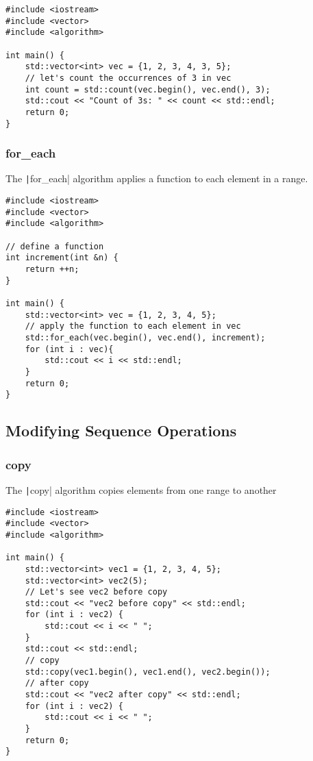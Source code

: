 \documentclass{article}
\begin{document}
\begin{verbatim}
#include <iostream>
#include <vector>
#include <algorithm>

int main() {
    std::vector<int> vec = {1, 2, 3, 4, 3, 5};
    // let's count the occurrences of 3 in vec
    int count = std::count(vec.begin(), vec.end(), 3);
    std::cout << "Count of 3s: " << count << std::endl;
    return 0;
}
\end{verbatim}

\subsubsection{for\_each}
The \texttt|for_each| algorithm applies a function to each element in a range.

\begin{verbatim}
#include <iostream>
#include <vector>
#include <algorithm>

// define a function
int increment(int &n) {
    return ++n;
}

int main() {
    std::vector<int> vec = {1, 2, 3, 4, 5};
    // apply the function to each element in vec
    std::for_each(vec.begin(), vec.end(), increment);
    for (int i : vec){
        std::cout << i << std::endl;
    }
    return 0;
}
\end{verbatim}

\subsection{Modifying Sequence Operations}

\subsubsection{copy}
The \texttt|copy| algorithm copies elements from one range to another

\begin{verbatim}
#include <iostream>
#include <vector>
#include <algorithm>

int main() {
    std::vector<int> vec1 = {1, 2, 3, 4, 5};
    std::vector<int> vec2(5);
    // Let's see vec2 before copy
    std::cout << "vec2 before copy" << std::endl;
    for (int i : vec2) {
        std::cout << i << " ";
    }
    std::cout << std::endl;
    // copy
    std::copy(vec1.begin(), vec1.end(), vec2.begin());
    // after copy
    std::cout << "vec2 after copy" << std::endl;
    for (int i : vec2) {
        std::cout << i << " ";
    }
    return 0;
}
\end{verbatim}
\end{document}
